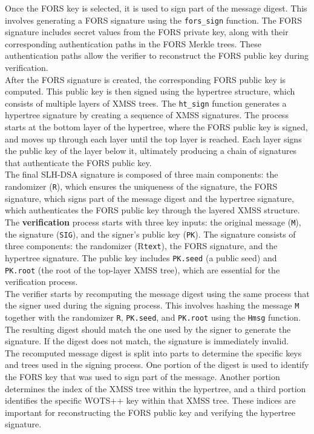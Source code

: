 \documentclass[journal=tosc,notanonymous]{iacrtrans}
\begin{document}
Once the FORS key is selected, it is used to sign part of the message digest. This involves generating a FORS signature using the \verb|fors_sign| function. The FORS signature includes secret values from the FORS private key, along with their corresponding authentication paths in the FORS Merkle trees. These authentication paths allow the verifier to reconstruct the FORS public key during verification.\\
After the FORS signature is created, the corresponding FORS public key is computed. This public key is then signed using the hypertree structure, which consists of multiple layers of XMSS trees. The \verb|ht_sign| function generates a hypertree signature by creating a sequence of XMSS signatures. The process starts at the bottom layer of the hypertree, where the FORS public key is signed, and moves up through each layer until the top layer is reached. Each layer signs the public key of the layer below it, ultimately producing a chain of signatures that authenticate the FORS public key.\\
The final SLH-DSA signature is composed of three main components:
the randomizer (\texttt{R}), which ensures the uniqueness of the signature, the FORS signature, which signs part of the message digest and the hypertree signature, which authenticates the FORS public key through the layered XMSS structure.\\
\newline
The \textbf{verification} process starts with three key inputs: the original message (\texttt{M}), the signature (\texttt{SIG}), and the signer's public key (\texttt{PK}). The signature consists of three components: the randomizer (R\texttt{text}), the FORS signature, and the hypertree signature. The public key includes \texttt{PK.seed} (a public seed) and \texttt{PK.root} (the root of the top-layer XMSS tree), which are essential for the verification process.\\
The verifier starts by recomputing the message digest using the same process that the signer used during the signing process. This involves hashing the message \texttt{M} together with the randomizer \texttt{R}, \texttt{PK.seed}, and \texttt{PK.root} using the \texttt{Hmsg} function. The resulting digest should match the one used by the signer to generate the signature. If the digest does not match, the signature is immediately invalid.\\
The recomputed message digest is split into parts to determine the specific keys and trees used in the signing process. One portion of the digest is used to identify the FORS key that was used to sign part of the message. Another portion determines the index of the XMSS tree within the hypertree, and a third portion identifies the specific WOTS++ key within that XMSS tree. These indices are important for reconstructing the FORS public key and verifying the hypertree signature.\\
\end{document}
